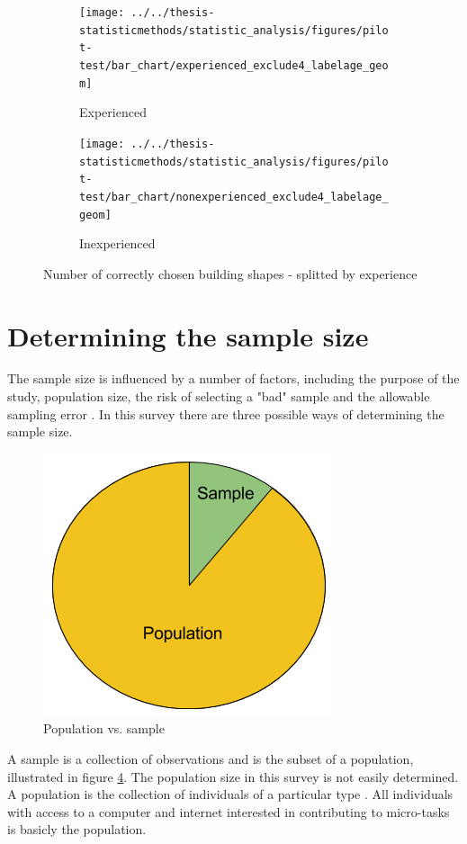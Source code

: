 \begin{figure}[H]
	\centering
	\begin{subfigure}[b]{0.45\textwidth}
		\centering
		\texttt{[image: ../../thesis-statisticmethods/statistic\_analysis/figures/pilot-test/bar\_chart/experienced\_exclude4\_labelage\_geom]}
		\caption{Experienced}
		\label{fig:experiencedexclude4labelagegeom}
	\end{subfigure}
	\begin{subfigure}[b]{0.45\textwidth}
		\centering
		\texttt{[image: ../../thesis-statisticmethods/statistic\_analysis/figures/pilot-test/bar\_chart/nonexperienced\_exclude4\_labelage\_geom]}
		\caption{Inexperienced}
		\label{fig:nonexperiencedexclude4labelagegeom}
	\end{subfigure}	
\caption[Correcly chosen shapes, sorted]{Number of correctly chosen building shapes - splitted by experience}
\end{figure}

\section[Sample Size]{Determining the sample size}
The sample size is influenced by a number of factors, including the purpose of the study, population size, the risk of selecting a "bad" sample and the allowable sampling error \citep{Israel1992}. In this survey there are three possible ways of determining the sample size. 

\begin{figure}[h]
	\centering
	\includegraphics[width=0.35\linewidth]{fig/popsample}
	\caption{Population vs. sample}
	\label{fig:popsample}
\end{figure}

A sample is a collection of observations and is the subset of a population, illustrated in figure \ref{fig:popsample}. The population size in this survey is not easily determined. A population is the collection of individuals of a particular type \citep{Walpole2012}. All individuals with access to a computer and internet interested in contributing to micro-tasks is basicly the population. 

